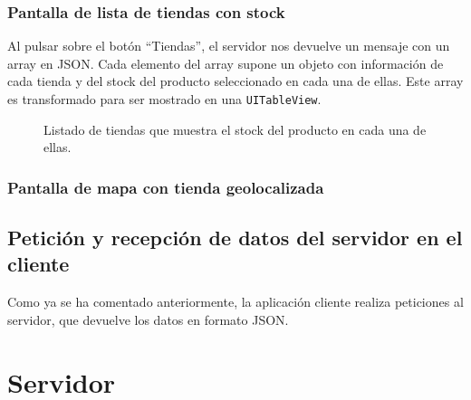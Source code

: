 \subsubsection{Pantalla de lista de tiendas con stock}
Al pulsar sobre el botón ``Tiendas'', el servidor nos devuelve un mensaje con un array en JSON. Cada elemento del array supone un objeto con información de cada tienda y del stock del producto seleccionado en cada una de ellas. Este array es transformado para ser mostrado en una \texttt{UITableView}.

\begin{figure}[H]
	\centering
	\caption{Listado de tiendas que muestra el stock del producto en cada una de ellas.}
	\label{fig:listaTiendas}
\end{figure}

\subsubsection{Pantalla de mapa con tienda geolocalizada}

\subsection{Petición y recepción de datos del servidor en el cliente}
Como ya se ha comentado anteriormente, la aplicación cliente realiza peticiones al servidor, que devuelve los datos en formato JSON.

\section{Servidor}

\chapterend